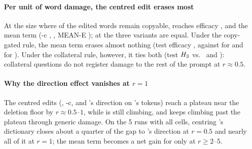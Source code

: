 \paragraph{Per unit of word damage, the centred edit erases most}
At the size where  of the edited words remain copyable, \cinder{} reaches efficacy , \cinderz{}  and the mean term  (\ember{}-c , \ember{} , MEAN-E ); at  the three \cinder{} variants are equal.
Under the copy-gated rule, the mean term erases almost nothing (test efficacy , against  for \cinder{} and  for \cinderz{}).
Under the collateral rule, however, it ties both (test $H_{3}$  vs.\  and ): collateral questions do not register damage to the rest of the prompt at $r \approx 0.5$.

\paragraph{Why the direction effect vanishes at $r = 1$}
The centred edits (\cinder{}, \ember{}-c, and \cinder{}'s direction on \ember{}'s tokens) reach a plateau near the deletion floor by $r \approx 0.5$--$1$, while \ember{} is still climbing, and keeps climbing past the plateau through generic damage.
On the 5 runs with all cells, centring \ember{}'s dictionary closes about a quarter of the gap to \cinder{}'s direction at $r = 0.5$ and nearly all of it at $r = 1$; the mean term becomes a net gain for \ember{} only at $r \geq 2$--$5$.

